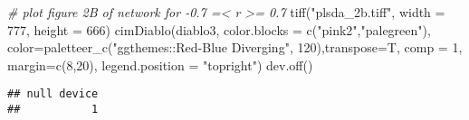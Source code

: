 \documentclass[
]{article}
\newenvironment{Shaded}{\begin{snugshade}}{\end{snugshade}}
\newcommand{\AttributeTok}[1]{\textcolor[rgb]{0.77,0.63,0.00}{#1}}
\newcommand{\CommentTok}[1]{\textcolor[rgb]{0.56,0.35,0.01}{\textit{#1}}}
\newcommand{\DecValTok}[1]{\textcolor[rgb]{0.00,0.00,0.81}{#1}}
\newcommand{\FunctionTok}[1]{\textcolor[rgb]{0.00,0.00,0.00}{#1}}
\newcommand{\NormalTok}[1]{#1}
\newcommand{\StringTok}[1]{\textcolor[rgb]{0.31,0.60,0.02}{#1}}
\begin{document}
\begin{Shaded}
\begin{Highlighting}[]
\CommentTok{\# plot figure 2B of network for {-}0.7 =\textless{} r \textgreater{}= 0.7}
\FunctionTok{tiff}\NormalTok{(}\StringTok{"plsda\_2b.tiff"}\NormalTok{, }\AttributeTok{width =} \DecValTok{777}\NormalTok{, }\AttributeTok{height =} \DecValTok{666}\NormalTok{)}
\FunctionTok{cimDiablo}\NormalTok{(diablo3, }\AttributeTok{color.blocks =} \FunctionTok{c}\NormalTok{(}\StringTok{"pink2"}\NormalTok{,}\StringTok{"palegreen"}\NormalTok{),  }
         \AttributeTok{color=}\FunctionTok{paletteer\_c}\NormalTok{(}\StringTok{"ggthemes::Red{-}Blue Diverging"}\NormalTok{, }\DecValTok{120}\NormalTok{),}\AttributeTok{transpose=}\NormalTok{T,}
          \AttributeTok{comp =} \DecValTok{1}\NormalTok{, }\AttributeTok{margin=}\FunctionTok{c}\NormalTok{(}\DecValTok{8}\NormalTok{,}\DecValTok{20}\NormalTok{), }\AttributeTok{legend.position =} \StringTok{"topright"}\NormalTok{)}
\FunctionTok{dev.off}\NormalTok{()}
\end{Highlighting}
\end{Shaded}

\begin{verbatim}
## null device 
##           1
\end{verbatim}
\end{document}
